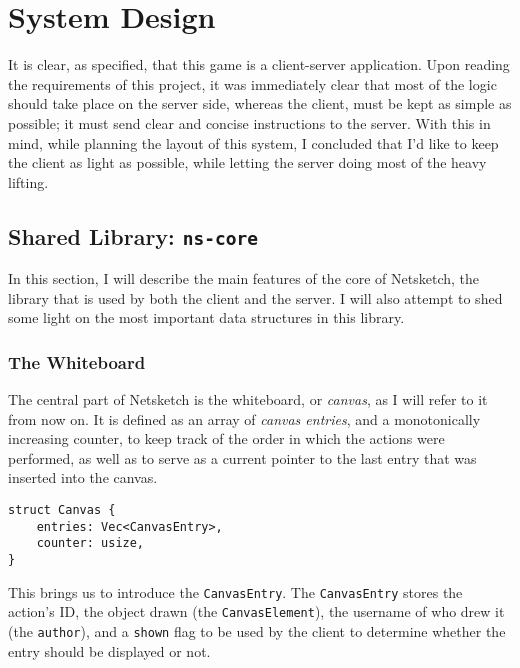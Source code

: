 \documentclass{article}
\newcommand{\code}[1]{\texttt{#1}}
\begin{document}
\newpage

\section{System Design}
It is clear, as specified, that this game is a client-server application. Upon
reading the requirements of this project, it was immediately clear that most of
the logic should take place on the server side, whereas the client, must be kept
as simple as possible; it must send clear and concise instructions to the server.
With this in mind, while planning the layout of this system, I concluded that
I'd like to keep the client as light as possible, while letting the server doing
most of the heavy lifting.

\subsection{Shared Library: \code{ns-core}}
In this section, I will describe the main features of the core of Netsketch, the library that is used by both the client and the server. I will also attempt to shed some light on the most important data structures in this library.

\subsubsection{The Whiteboard}

The central part of Netsketch is the whiteboard, or \textit{canvas}, as I will
refer to it from now on. It is defined as an array of \textit{canvas entries},
and a monotonically increasing counter, to keep track of the order in which the
actions were performed, as well as to serve as a current pointer to the last
entry that was inserted into the canvas.

\begin{center}
    \begin{lstlisting}
struct Canvas {
    entries: Vec<CanvasEntry>,
    counter: usize,
}
        \end{lstlisting}

\end{center}

This brings us to introduce the \code{CanvasEntry}. The \code{CanvasEntry} stores the action's ID, the object drawn (the \code{CanvasElement}), the username of who drew it (the \code{author}), and a \code{shown} flag to be used by the client to determine whether the entry should be displayed or not.
\end{document}
